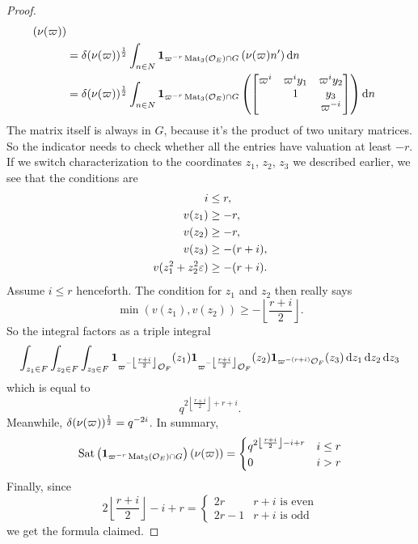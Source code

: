 \begin{proof}
\begin{align*}
      \left( \nu(\varpi)  \right) \\
    &= \delta(\nu(\varpi))^\half \int_{n \in N}
      \mathbf{1}_{\varpi^{-r} \Mat_3(\OO_E) \cap G}
      \left( \nu(\varpi) n' \right) \odif n \\
    &= \delta(\nu(\varpi))^\half \int_{n \in N}
      \mathbf{1}_{{\varpi^{-r}} \Mat_3(\OO_E) \cap G}
      \left( \begin{bmatrix} \varpi^i & \varpi^i y_1 & \varpi^i y_2 \\
               & 1 & y_3 \\
               & & \varpi^{-i} \end{bmatrix} \right) \odif n
  \end{align*}
  The matrix itself is always in $G$, because it's the product of two unitary matrices.
  So the indicator needs to check whether all the entries have valuation at least $-r$.
  If we switch characterization to the coordinates $z_1$, $z_2$, $z_3$ we described earlier,
  we see that the conditions are
  \begin{align*}
    i &\le r, \\
    v(z_1) &\ge -r, \\
    v(z_2) &\ge -r,\\
    v(z_3) &\ge -(r+i),\\
    v(z_1^2 + z_2^2 \varepsilon) &\ge -(r+i).
  \end{align*}
  Assume $i \le r$ henceforth.
  The condition for $z_1$ and $z_2$ then really says
  \[ \min(v(z_1), v(z_2)) \ge -\left\lfloor \frac{r+i}{2} \right\rfloor. \]
  So the integral factors as a triple integral
  \[
    \int_{z_1 \in F}
    \int_{z_2 \in F}
    \int_{z_3 \in F}
    \mathbf{1}_{\varpi^{-\left\lfloor \frac{r+i}{2} \right\rfloor} \OO_F}(z_1)
    \mathbf{1}_{\varpi^{-\left\lfloor \frac{r+i}{2} \right\rfloor} \OO_F}(z_2)
    \mathbf{1}_{\varpi^{-(r+i)} \OO_F}(z_3)
    \odif{z_1,z_2,z_3}
  \]
  which is equal to
  \[ q^{2\left\lfloor \frac{r+i}{2} \right\rfloor+r+i}. \]
  Meanwhile, $\delta(\nu(\varpi))^{\frac{1}{2}} = q^{-2i}$.
  In summary,
  \[
    \operatorname{Sat}\left( \mathbf{1}_{\varpi^{-r} \operatorname{Mat}_3(\mathcal O_E) \cap G}\right) \left( \nu(\varpi) \right)
    =
    \begin{cases}
      q^{2\left\lfloor \frac{r+i}{2} \right\rfloor - i + r} & i \le r \\
      0 & i > r
    \end{cases}
  \]
  Finally, since
  \[ 2\left\lfloor \frac{r+i}{2} \right\rfloor - i + r
    = \begin{cases}
      2r & r+i \text{ is even} \\
      2r-1 & r+i \text{ is odd}
    \end{cases}
  \]
  we get the formula claimed.
\end{proof}

